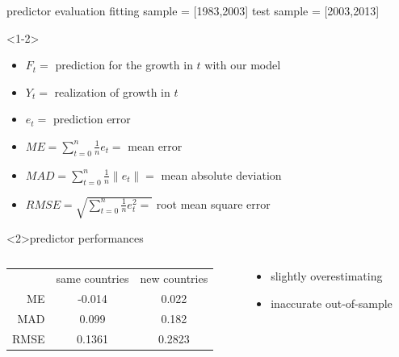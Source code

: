 \documentclass[9pt]{beamer}
\begin{document}
\begin{frame}{predictor evaluation}
	fitting sample = [1983,2003] \qquad test sample = [2003,2013]
	\begin{definition}<1-2>
		\begin{itemize}
			\item $F_t =$ prediction for the growth in $t$ with our model
			\item $Y_t =$ realization of growth in $t$
			\item $e_t =$ prediction error
			\item $ME = \sum_{t=0}^{n}\frac{1}{n}e_t =$ mean error 
			\item $MAD = \sum_{t=0}^{n}\frac{1}{n}\|e_t\| = $ mean absolute deviation 
			\item $ RMSE = \sqrt{\sum_{t=0}^{n}\frac{1}{n}e_t^{2} =}$ root mean square error
		\end{itemize}
		
	\end{definition}
	\begin{block}{predictor performances}
	\begin{columns}
		\begin{column}{5cm}
		\begin{tabular}{ r|c|c| }
			\multicolumn{1}{r}{}
			&  \multicolumn{1}{c}{same countries}
			& \multicolumn{1}{c}{new countries} \\
			\cline{2-3}
			ME & -0.014 & 0.022 \\
			\cline{2-3}
			MAD & 0.099 & 0.182 \\
			\cline{2-3}
			RMSE & 0.1361 & 0.2823 \\
			\cline{2-3}
		\end{tabular}
	\end{column}
	\begin{column}{3cm}
		\begin{itemize}
			\item slightly overestimating
			\item inaccurate out-of-sample
		\end{itemize}
	\end{column}
    \end{columns}
	\end{block}	
	
	
\end{frame}
\end{document}
